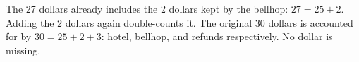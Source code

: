 The 27 dollars already includes the 2 dollars kept by the bellhop: $27=25+2$. Adding the 2 dollars again double-counts it. The original 30 dollars is accounted for by $\boxed{30=25+2+3}$: hotel, bellhop, and refunds respectively. No dollar is missing.
